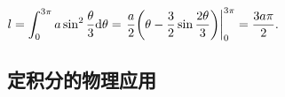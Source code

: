 \begin{solution}
    $l=\displaystyle\int_{0}^{3\pi}a\sin^2\dfrac{\theta}{3}\dd \theta=\eval{\dfrac{a}{2}\qty(\theta-\dfrac{3}{2}\sin\dfrac{2\theta}{3})}_{0}^{3\pi}=\dfrac{3a\pi}{2}.$
\end{solution}

\subsection{定积分的物理应用}





